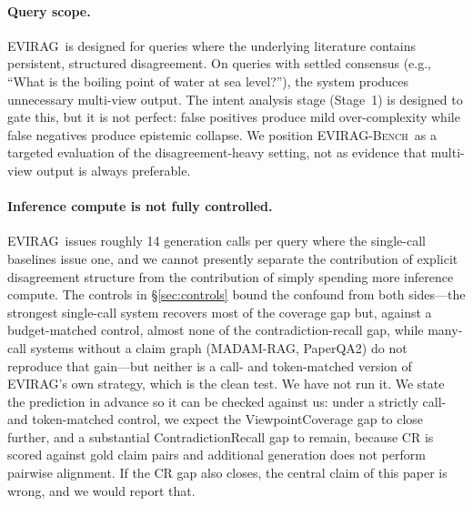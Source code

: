 \documentclass[11pt]{article}
\newcommand{\system}{\textsc{EVIRAG}\xspace}
\newcommand{\bench}{\textsc{EVIRAG-Bench}\xspace}
\begin{document}
\paragraph{Query scope.}
\system\ is designed for queries where the underlying literature contains
persistent, structured disagreement.  On queries with settled consensus
(e.g., ``What is the boiling point of water at sea level?''), the system
produces unnecessary multi-view output.  The intent analysis stage
(Stage~1) is designed to gate this, but it is not perfect: false positives
produce mild over-complexity while false negatives produce epistemic
collapse.  We position \bench\ as a targeted evaluation of the
disagreement-heavy setting, not as evidence that multi-view output is
always preferable.

\paragraph{Inference compute is not fully controlled.}
\system\ issues roughly 14 generation calls per query where the single-call
baselines issue one, and we cannot presently separate the contribution of
explicit disagreement structure from the contribution of simply spending more
inference compute.  The controls in \S\ref{sec:controls} bound the confound
from both sides---the strongest single-call system recovers most of the
coverage gap but, against a budget-matched control, almost none of the
contradiction-recall gap, while
many-call systems without a claim graph (MADAM-RAG, PaperQA2) do not reproduce
that gain---but neither is a call- and token-matched version of \system's own
strategy, which is the clean test.  We have not run it.  We state the
prediction in advance so it can be checked against us: under a strictly call-
and token-matched control, we expect the ViewpointCoverage gap to close
further, and a substantial ContradictionRecall gap to remain, because CR is
scored against gold claim pairs and additional generation does not perform
pairwise alignment.  If the CR gap also closes, the central claim of this
paper is wrong, and we would report that.
\end{document}

